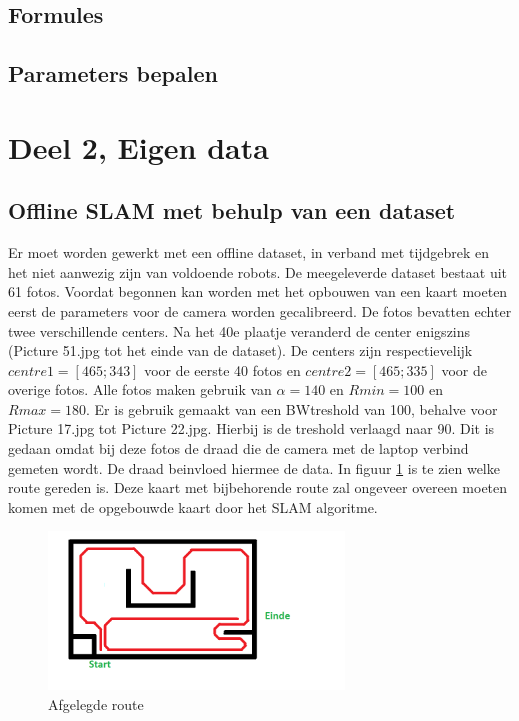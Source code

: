 \documentclass[a4paper]{article}
\begin{document}
\subsection{Formules}
\subsection{Parameters bepalen}
\section{Deel 2, Eigen data}
\subsection{Offline SLAM met behulp van een dataset}
Er moet worden gewerkt met een offline dataset, in verband met tijdgebrek en het niet aanwezig zijn van voldoende robots. De meegeleverde dataset bestaat uit 61 fotos.
Voordat begonnen kan worden met het opbouwen van een kaart moeten eerst de parameters voor de camera worden gecalibreerd. De fotos bevatten echter twee verschillende centers. Na het 40e plaatje veranderd de center enigszins (Picture 51.jpg tot het einde van de dataset). De centers zijn respectievelijk $centre1 = [465;343]$ voor de eerste 40 fotos en $centre2=[465;335]$ voor de overige fotos. Alle fotos maken gebruik van $\alpha = 140$ en $Rmin = 100$ en $Rmax = 180$. Er is gebruik gemaakt van een BWtreshold van 100, behalve voor Picture 17.jpg tot Picture 22.jpg. Hierbij is de treshold verlaagd naar 90. Dit is gedaan omdat bij deze fotos de draad die de camera met de laptop verbind gemeten wordt. De draad beinvloed hiermee de data. In figuur \ref{fig:route} is te zien welke route gereden is.
Deze kaart met bijbehorende route zal ongeveer overeen moeten komen met de opgebouwde kaart door het SLAM algoritme.
\begin{figure}[h]
	\centering
	\includegraphics[width=0.7\textwidth]{matlab/imgs/route.png}
	\caption{Afgelegde route}
	\label{fig:route}
\end{figure}
\end{document}
